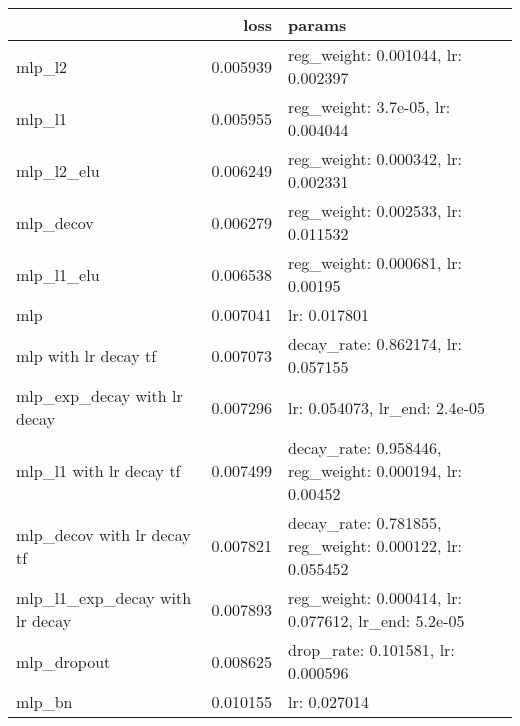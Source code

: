 \begin{tabular}{lrl}
\toprule
{} &      loss &                                                    params \\
\midrule
mlp\_l2                         &  0.005939 &                        reg\_weight: 0.001044, lr: 0.002397 \\
mlp\_l1                         &  0.005955 &                         reg\_weight: 3.7e-05, lr: 0.004044 \\
mlp\_l2\_elu                     &  0.006249 &                        reg\_weight: 0.000342, lr: 0.002331 \\
mlp\_decov                      &  0.006279 &                        reg\_weight: 0.002533, lr: 0.011532 \\
mlp\_l1\_elu                     &  0.006538 &                         reg\_weight: 0.000681, lr: 0.00195 \\
mlp                            &  0.007041 &                                              lr: 0.017801 \\
mlp with lr decay tf           &  0.007073 &                        decay\_rate: 0.862174, lr: 0.057155 \\
mlp\_exp\_decay with lr decay    &  0.007296 &                             lr: 0.054073, lr\_end: 2.4e-05 \\
mlp\_l1 with lr decay tf        &  0.007499 &   decay\_rate: 0.958446, reg\_weight: 0.000194, lr: 0.00452 \\
mlp\_decov with lr decay tf     &  0.007821 &  decay\_rate: 0.781855, reg\_weight: 0.000122, lr: 0.055452 \\
mlp\_l1\_exp\_decay with lr decay &  0.007893 &       reg\_weight: 0.000414, lr: 0.077612, lr\_end: 5.2e-05 \\
mlp\_dropout                    &  0.008625 &                         drop\_rate: 0.101581, lr: 0.000596 \\
mlp\_bn                         &  0.010155 &                                              lr: 0.027014 \\
\bottomrule
\end{tabular}
